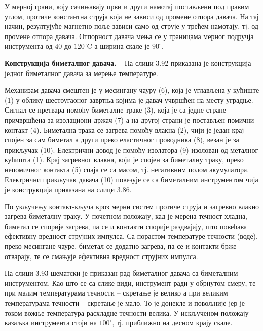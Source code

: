 \documentclass[12pt,a4paper]{report}
\begin{document}
У мерној грани, коју сачињавају први и други намотај постављени под правим углом, протиче константна струја која не зависи од промене отпора давача. На тај начин, резултујуће магнетно поље зависи само од струје у трећем намотају, тј. од промене отпора давача. Отпорност давача мења се у границама мерног подручја инструмента од $40$ до $120^\circ\text{C}$ а ширина скале је $90^\circ$.

\textbf{Конструкција биметалног давача.} – На слици 3.92 приказана је конструкција једног биметалног давача за мерење температуре.


Механизам давача смештен је у месингану чауру (6), која је углављена у кућиште (1) у облику шестоугаоног завртња којима је давач учвршћен на месту уградње. Сигнал се претвара помоћу биметалне траке (3), која је са једне стране причвршћена за изолациони држач (7) а на другој страни је постављен помични контакт (4). Биметална трака се загрева помоћу влакна (2), чији је један крај спојен за сам биметал а други преко еластичног проводника (8), везан је за прикључак (10). Електрични довод је помоћу изолатора (9) изолован од металног кућишта (1). Крај загревног влакна, који је спојен за биметалну траку, преко непомичног контакта (5) спаја се са масом, тј. негативним полом акумулатора. Електрични прикључак давача (10) повезује се са биметалним инструментом чија је конструкција приказана на слици 3.86.

По укључењу контакт-кључа кроз мерни систем протиче струја и загревно влакно загрева биметалну траку. У почетном положају, кад је мерена течност хладна, биметал се спорије загрева, па се и контакти спорије раздвајају, што повећава ефективну вредност струјних импулса. Са порастом температуре течности (воде), преко месингане чауре, биметал се додатно загрева, па се и контакти брже отварају, те се смањује ефективна вредност струјних импулса.

На слици 3.93 шематски је приказан рад биметалног давача са биметалним инструментом. Као што се са слике види, инструмент ради у обрнутом смеру, те при малим температурама течности – скретање је велико а при великим температурама течности – скретање је мало. То је донекле и повољније јер је током вожње температура расхладне течности велика. У искљученом положају казаљка инструмента стоји на $100^\circ$, тј. приближно на десном крају скале.
\end{document}
